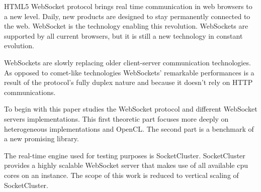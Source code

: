 HTML5 WebSocket protocol brings real time communication in web browsers to a
new level. Daily, new products are designed to stay permanently connected to
the web. WebSocket is the technology enabling this revolution. WebSockets are
supported by all current browsers, but it is still a new technology in constant
evolution.

WebSockets are slowly replacing older client-server communication
technologies. As opposed to comet-like technologies WebSockets' remarkable
performances is a result of the protocol's fully duplex nature and because it
doesn't rely on HTTP communications.

To begin with this paper studies the WebSocket protocol and different 
WebSocket servers implementations. This first theoretic part focuses more 
deeply on heterogeneous implementations and OpenCL. The second part is
a benchmark of a new promising library. 

The real-time engine used for testing purposes is SocketCluster. SocketCluster
provides a highly scalable WebSocket server that makes use of all available cpu
cores on an instance. The scope of this work is reduced to vertical scaling of 
SocketCluster.



